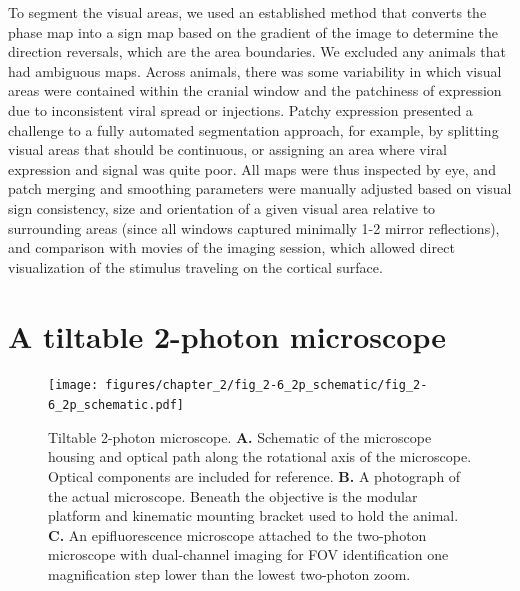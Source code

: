 To segment the visual areas, we used an established method that converts the phase map into a sign map based on the gradient of the image to determine the direction reversals, which are the area boundaries\cite{Garrett2014, Zhuang2017}. We excluded any animals that had ambiguous maps. Across animals, there was some variability in which visual areas were contained within the cranial window and the patchiness of expression due to inconsistent viral spread or injections. Patchy expression presented a challenge to a fully automated segmentation approach, for example, by splitting visual areas that should be continuous, or assigning an area where viral expression and signal was quite poor. All maps were thus inspected by eye, and patch merging and smoothing parameters were manually adjusted based on visual sign consistency, size and orientation of a given visual area relative to surrounding areas (since all windows captured minimally 1-2 mirror reflections), and comparison with movies of the imaging session, which allowed direct visualization of the stimulus traveling on the cortical surface. 

\section{A tiltable 2-photon microscope}

\begin{figure}[t!]
    \texttt{[image: figures/chapter\_2/fig\_2-6\_2p\_schematic/fig\_2-6\_2p\_schematic.pdf]}
    \vspace{.1in}
    \caption[Tilting two-photon microscope]{Tiltable 2-photon microscope. 
    \textbf{A.} Schematic of the microscope housing and optical path along the rotational axis of the microscope. Optical components are included for reference.
    \textbf{B.} A photograph of the actual microscope. Beneath the objective is the modular platform and kinematic mounting bracket used to hold the animal.
    \textbf{C.} An epifluorescence microscope attached to the two-photon microscope with dual-channel imaging for FOV identification one magnification step lower than the lowest two-photon zoom.  
    \label{fig:2p_schematic}}
\end{figure}

